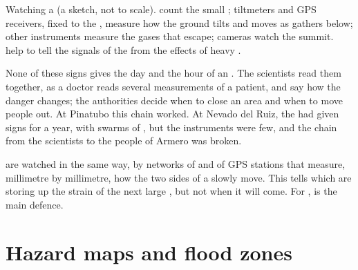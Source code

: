 \begin{omfigure}
{\small Watching a  (a sketch, not to scale).  count
the small ; tiltmeters and GPS receivers, fixed to the ,
measure how the ground tilts and moves as  gathers below;
other instruments measure the gases that escape; cameras watch the
summit.  help to tell the signals of the  from the
effects of heavy .}
\label{fig:g9:natural-risks:monitoring}
\end{omfigure}

None of these signs gives the day and the hour of an . The
scientists read them together, as a doctor reads several measurements
of a patient, and say how the danger changes; the authorities decide
when to close an area and when to move people out. At Pinatubo this
chain worked. At Nevado del Ruiz, the  had given signs for a year,
with swarms of , but the instruments were few, and the chain
from the scientists to the people of Armero was broken.

 are watched in the same way, by networks of  and of
GPS stations that measure, millimetre by millimetre, how the two sides of
a  slowly move. This tells which  are storing up the strain
of the next large , but not when it will come. For
,  is the main defence.

\section{Hazard maps and flood zones}

